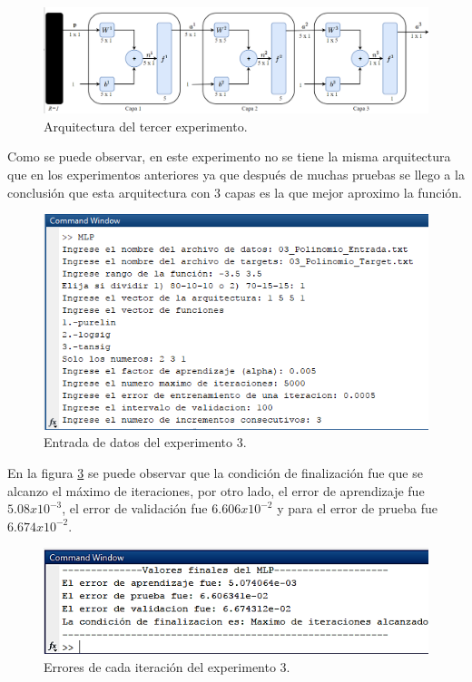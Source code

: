 \begin{figure}[H]
    \begin{center}
        \includegraphics[width=16cm]{img/arqui3.png}
        \caption{Arquitectura del tercer experimento.}
        \label{fig:arqui3}
    \end{center}
\end{figure}
Como se puede observar, en este experimento no se tiene la misma arquitectura que en los experimentos anteriores ya que después de muchas pruebas se llego a la conclusión que esta arquitectura con 3 capas es la que mejor aproximo la función.
\begin{figure}[H]
    \begin{center}
        \includegraphics[width=14cm]{3/entrada.png}
        \caption{Entrada de datos del experimento 3.}
        \label{fig:entrada3}
    \end{center}
\end{figure}
En la figura \ref{fig:salida3} se puede observar que la condición de finalización fue que se alcanzo el máximo de iteraciones, por otro lado, el error de aprendizaje fue $5.08 x 10^{-3}$, el error de validación fue $6.606 x 10^{-2}$ y para el error de prueba fue $6.674 x 10^{-2}$.
\begin{figure}[H]
    \begin{center}
        \includegraphics[width=14cm]{3/salida.png}
        \caption{Errores de cada iteración del experimento 3.}
        \label{fig:salida3}
    \end{center}
\end{figure}
